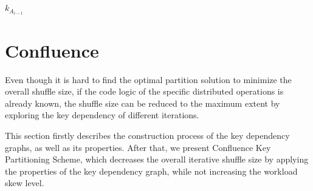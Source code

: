 \documentclass[10pt,journal,compsoc]{IEEEtran}
\begin{document}

\subsection{}
$k_{A_{i-1}}$

\section{Confluence}\label{section:keyDependencyGraph}
Even though it is hard to find the optimal partition solution to minimize the overall shuffle size,
if the code logic of the specific distributed operations is already known, 
the shuffle size can be reduced to the maximum extent %
by exploring the key dependency of different iterations. 

This section firstly describes the construction process of the key dependency graphs, as well as its properties. 
After that, we present Confluence Key Partitioning Scheme, which decreases the overall iterative shuffle size by applying the properties of the key dependency graph, while not increasing the workload skew level. 


\end{document}

